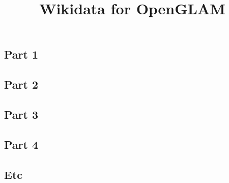 \documentclass{article}
\begin{document}
\title{Wikidata for OpenGLAM}

\maketitle


\subsection{Part 1}\label{H8963524}






\subsection{Part 2}\label{H3124040}






\subsection{Part 3}\label{H3484795}






\subsection{Part 4}\label{H4450718}






\subsection{Etc}\label{H9436562}
\end{document}
